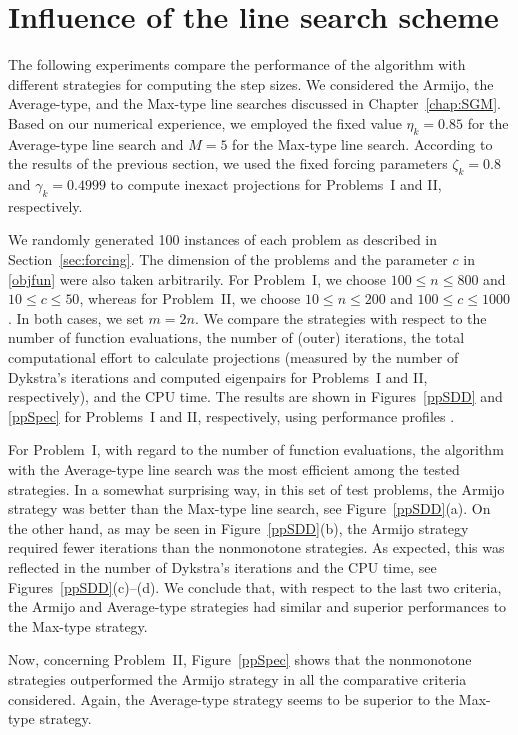 \section{Influence of the line search scheme}

The following experiments compare the performance of the algorithm with different strategies for computing the step sizes. We considered the Armijo, the Average-type, and the Max-type line searches discussed in Chapter~\ref{chap:SGM}.
Based on our numerical experience, we employed the fixed value $\eta_k=0.85$ for the Average-type line search and $M=5$ for the Max-type line search.
According to the results of the previous section, we used the fixed forcing parameters $\zeta_k=0.8$ and $\gamma_k=0.4999$ to compute inexact projections for Problems~I and II, respectively.

We randomly generated 100 instances of each problem as described in Section~\ref{sec:forcing}. The dimension of the problems and the parameter $c$ in \eqref{objfun} were also taken arbitrarily. For Problem~I, we choose $100\leq n \leq 800$ and $10\leq c \leq 50$, whereas for Problem~II, we choose $10\leq n \leq 200$ and $100\leq c \leq 1000$. In both cases, we set $m=2n$.
We compare the strategies with respect to the number of function evaluations, the number of (outer) iterations, the total computational effort to calculate projections (measured by the number of Dykstra’s iterations and computed eigenpairs for Problems~I and II, respectively), and the CPU time. The results are shown in Figures~\ref{ppSDD} and \ref{ppSpec} for Problems~I and II, respectively, using performance profiles \cite{dolan2002benchmarking}.

For Problem~I, with regard to the number of function evaluations, the algorithm with the Average-type line search was the most efficient among the tested strategies.
In a somewhat surprising way, in this set of test problems, the Armijo strategy was better than the Max-type line search, see Figure~\ref{ppSDD}(a).
On the other hand, as may be seen in Figure~\ref{ppSDD}(b), the Armijo strategy required fewer iterations than the nonmonotone strategies.
As expected, this was reflected in the number of Dykstra’s iterations and the CPU time, see Figures~\ref{ppSDD}(c)--(d).
We conclude that, with respect to the last two criteria, the Armijo and Average-type strategies had similar and superior performances to the Max-type strategy.

Now, concerning Problem~II, Figure~\ref{ppSpec} shows that the nonmonotone strategies outperformed the Armijo strategy in all the comparative criteria considered.
Again,  the Average-type strategy seems to be superior to the Max-type strategy.

